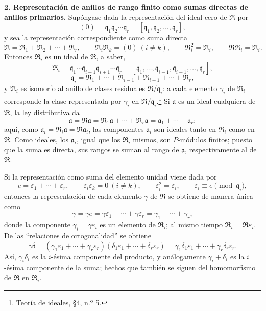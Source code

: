 \documentclass[11pt]{article}
\begin{document}
\textbf{2. Representación de anillos de rango finito como sumas directas de anillos primarios.} Supóngase dada la representación del ideal cero de $\mathfrak R$ por
\[
   (0)=\mathfrak q_1\mathfrak q_2\cdots\mathfrak q_r
       =[\mathfrak q_1,\mathfrak q_2,\ldots,\mathfrak q_r],
\]
y sea la representación correspondiente como suma directa
\[
   \mathfrak R=\mathfrak R_1+\mathfrak R_2+\cdots+\mathfrak R_r,
   \qquad
   \mathfrak R_i\mathfrak R_k=(0)\ (i\ne k),
   \qquad
   \mathfrak R_i^2=\mathfrak R_i,
   \qquad
   \mathfrak R\mathfrak R_i=\mathfrak R_i .
\]
Entonces $\mathfrak R_i$ es un ideal de $\mathfrak R$, a saber,
\[
   \mathfrak R_i
   =\mathfrak q_1\cdots\mathfrak q_{i-1}\mathfrak q_{i+1}\cdots\mathfrak q_r
   =[\mathfrak q_1,\ldots,\mathfrak q_{i-1},\mathfrak q_{i+1},\ldots,\mathfrak q_r],
\]
\[
   \mathfrak q_i=\mathfrak R_1+\cdots+\mathfrak R_{i-1}+\mathfrak R_{i+1}+\cdots+\mathfrak R_r,
\]
y $\mathfrak R_i$ es isomorfo al anillo de clases residuales $\mathfrak R/\mathfrak q_i$: a cada elemento $\gamma_i$ de $\mathfrak R_i$ corresponde la clase representada por $\gamma_i$ en $\mathfrak R/\mathfrak q_i$.\footnote{Teoría de ideales, \S 4, n.º 5.} Si $\mathfrak a$ es un ideal cualquiera de $\mathfrak R$, la ley distributiva da
\[
   \mathfrak a=\mathfrak R\mathfrak a
   =\mathfrak R_1\mathfrak a+\cdots+\mathfrak R_r\mathfrak a
   =\mathfrak a_1+\cdots+\mathfrak a_r;
\]
aquí, como $\mathfrak a_i=\mathfrak R_i\mathfrak a=\mathfrak R\mathfrak a_i$, las componentes $\mathfrak a_i$ son ideales tanto en $\mathfrak R_i$ como en $\mathfrak R$. Como ideales, los $\mathfrak a_i$, igual que los $\mathfrak R_i$ mismos, son $P$-módulos finitos; puesto que la suma es directa, sus rangos se suman al rango de $\mathfrak a$, respectivamente al de $\mathfrak R$.

Si la representación como suma del elemento unidad viene dada por
\[
   e=\varepsilon_1+\cdots+\varepsilon_r,
   \qquad
   \varepsilon_i\varepsilon_k=0\ (i\ne k),
   \qquad
   \varepsilon_i^2=\varepsilon_i,
   \qquad
   \varepsilon_i\equiv e\pmod{\mathfrak q_i},
\]
entonces la representación de cada elemento $\gamma$ de $\mathfrak R$ se obtiene de manera única como
\[
   \gamma=\gamma e=\gamma\varepsilon_1+\cdots+\gamma\varepsilon_r
   =\gamma_1+\cdots+\gamma_r,
\]
donde la componente $\gamma_i=\gamma\varepsilon_i$ es un elemento de $\mathfrak R_i$; al mismo tiempo $\mathfrak R_i=\mathfrak R\varepsilon_i$. De las ``relaciones de ortogonalidad'' se obtiene
\[
   \gamma\delta=(\gamma_1\varepsilon_1+\cdots+\gamma_r\varepsilon_r)
      (\delta_1\varepsilon_1+\cdots+\delta_r\varepsilon_r)
   =\gamma_1\delta_1\varepsilon_1+\cdots+\gamma_r\delta_r\varepsilon_r.
\]
Así, $\gamma_i\delta_i$ es la $i$-ésima componente del producto, y análogamente $\gamma_i+\delta_i$ es la $i$-ésima componente de la suma; hechos que también se siguen del homomorfismo de $\mathfrak R$ en $\mathfrak R_i$.
\end{document}
